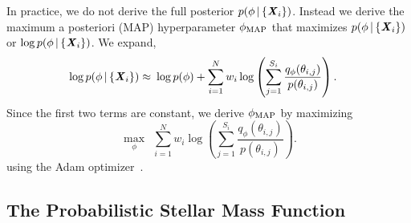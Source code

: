 In practice, we do not derive the full posterior 
$p(\phi \,|\, \{{\textbf{\textit{X}}_i}\})$. 
Instead we derive the maximum a posteriori (MAP) hyperparameter 
$\phi_{\rm MAP}$ that maximizes $p(\phi \,|\, \{{\textbf{\textit{X}}_i}\})$ or 
$\log p(\phi \,|\, \{{\textbf{\textit{X}}_i}\})$.
We expand, 
\begin{align}
\log p(\phi \given \{{\bfi X_i}\}) 
    \approx&~\log p(\phi) + %
    \sum\limits_{i=1}^N w_i \log \left(\sum\limits_{j=1}^{S_i} \frac{q_\phi(\theta_{i,j})}{p(\theta_{i,j})} \right).
\end{align} 
Since the first two terms are constant, we derive $\phi_{\rm MAP}$ by
maximizing 
\begin{equation}
    \max_\phi~~\sum\limits_{i=1}^N w_i \log \left(\sum\limits_{j=1}^{S_i} \frac{q_\phi(\theta_{i,j})}{p(\theta_{i,j})} \right).
\end{equation}
using the {\sc Adam} optimizer~\citep{}.  




\subsection{The Probabilistic Stellar Mass Function} \label{sec:psmf}

